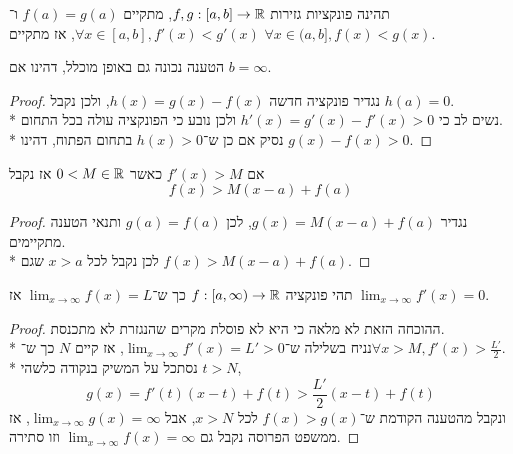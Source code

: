



\begin{proposition}
	תהינה פונקציות גזירות $f, g : [a, b] \to \mathbb{R}$,
	מתקיים $f(a) = g(a)$ ו־$\forall x \in [a, b], f'(x) < g'(x)$,
	אז מתקיים $\forall x \in (a, b], f(x) < g(x)$.
\end{proposition}
\begin{remark}
	הטענה נכונה גם באופן מוכלל, דהינו אם $b = \infty$.
\end{remark}
\begin{proof}
	נגדיר פונקציה חדשה $h(x) = g(x) - f(x)$, ולכן נקבל $h(a) = 0$. \\*
	נשים לב כי $h'(x) = g'(x) - f'(x) > 0$ ולכן נובע כי הפונקציה עולה בכל התחום. \\*
	נסיק אם כן ש־$h(x) > 0$ בתחום הפתוח, דהינו $g(x) - f(x) > 0$.
\end{proof}
\begin{conclusion}
	אם $f'(x) > M$ כאשר $0 < M \in \mathbb{R}$ אז נקבל
	\[
		f(x) > M(x - a) + f(a)
	\]
\end{conclusion}
\begin{proof}
	נגדיר $g(x) = M(x - a) + f(a)$, לכן $g(a) = f(a)$ ותנאי הטענה מתקיימים. \\*
	לכן נקבל לכל $x > a$ שגם $f(x) > M(x - a) + f(a)$.
\end{proof}
\begin{proposition}
	תהי פונקציה $f : [a, \infty) \to \mathbb{R}$ כך ש־$\lim_{x \to \infty} f(x) = L$ אז $\lim_{x \to \infty} f'(x) = 0$.
\end{proposition}
\begin{proof}
	ההוכחה הזאת לא מלאה כי היא לא פוסלת מקרים שהנגזרת לא מתכנסת. \\*
	נניח בשלילה ש־$\lim_{x \to \infty} f'(x) = L' > 0$,
	אז קיים $N$ כך ש־$\forall x > M, f'(x) > \frac{L'}{2}$. \\*
	נסתכל על המשיק בנקודה כלשהי $t > N$,
	\[
		g(x) = f'(t)(x - t) + f(t) > \frac{L'}{2}(x - t) + f(t)
	\]
	ונקבל מהטענה הקודמת ש־$f(x) > g(x)$ לכל $x > N$, אבל $\lim_{x \to \infty} g(x) = \infty$,
	אז ממשפט הפרוסה נקבל גם $\lim_{x \to \infty} f(x) = \infty$ וזו סתירה.
\end{proof}



